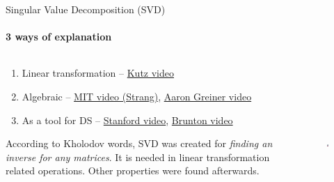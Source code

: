 \documentclass[aspectratio=169]{beamer}
\begin{document}
\begin{frame}[t]{Singular Value Decomposition (SVD)}
\framesubtitle{3 ways of explanation}
    \begin{columns}[T,onlytextwidth]
        \begin{column}{0.69\textwidth}
            \begin{enumerate}
                \item Linear transformation – \href{https://youtu.be/EokL7E6o1AE}{Kutz video}
                \item Algebraic – \href{https://ocw.mit.edu/courses/mathematics/18-06-linear-algebra-spring-2010/video-lectures/lecture-29-singular-value-decomposition/}{MIT video (Strang)}, \href{https://youtu.be/EfZsEFhHcNM}{Aaron Greiner video}
                \item As a tool for DS  – \href{https://youtu.be/P5mlg91as1c}{Stanford video}, \href{https://youtu.be/yA66KsFqUAE}{Brunton video}
            \end{enumerate}

            According to Kholodov words, SVD was created for \textit{finding an inverse for any matrices}. It is needed in linear transformation related operations. Other properties were found afterwards. 
        \end{column}
        \begin{column}{0.29\textwidth}
            \vspace{-1cm}
            \begin{figure}[H]
                \centering\includegraphics[height=6cm,width=1\textwidth,keepaspectratio]{two_buttons.jpg}
                \label{fig:two_buttons.jpg}
            \end{figure}
        \end{column}
    \end{columns}
\end{frame}
\end{document}
